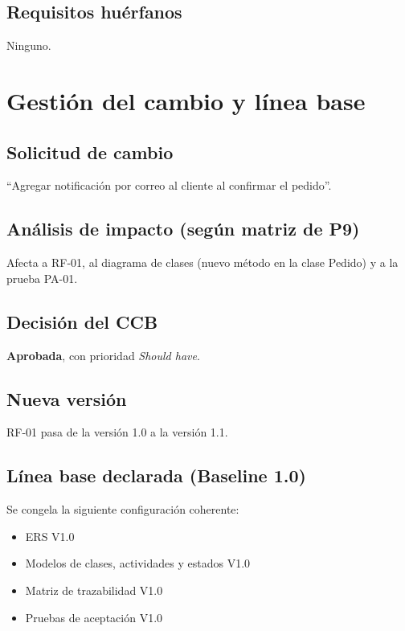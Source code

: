 \documentclass[11pt,a4paper]{article}
\begin{document}
\subsection*{Requisitos huérfanos}
Ninguno.

\section{Gestión del cambio y línea base}

\subsection*{Solicitud de cambio}
``Agregar notificación por correo al cliente al confirmar el pedido''.

\subsection*{Análisis de impacto (según matriz de P9)}
Afecta a RF-01, al diagrama de clases (nuevo método en la clase Pedido) y a la prueba PA-01.

\subsection*{Decisión del CCB}
\textbf{Aprobada}, con prioridad \emph{Should have}.

\subsection*{Nueva versión}
RF-01 pasa de la versión 1.0 a la versión 1.1.

\subsection*{Línea base declarada (Baseline 1.0)}
Se congela la siguiente configuración coherente:
\begin{itemize}[leftmargin=1.2cm]
  \item ERS V1.0
  \item Modelos de clases, actividades y estados V1.0
  \item Matriz de trazabilidad V1.0
  \item Pruebas de aceptación V1.0
\end{itemize}
\end{document}
